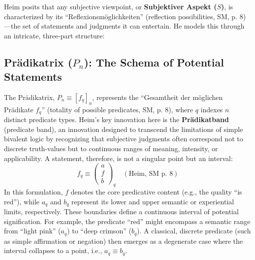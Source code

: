 \documentclass[
    12pt,              %
    a4paper,           %
    headings=normal,   %
    twoside=true,      %
    BCOR=8mm,          %
]{scrbook}
\newcommand{\q}[1]{\enquote{#1}}
\newcommand{\subjektiveraspekt}{S}
\begin{document}
Heim posits that any subjective viewpoint, or \textbf{Subjektiver Aspekt (\(\subjektiveraspekt\))}, is characterized by its \q{Reflexionsmöglichkeiten} (reflection possibilities, SM, p. 8)—the set of statements and judgments it can entertain. He models this through an intricate, three-part structure:

\subsection{\texorpdfstring{Prädikatrix (\(P_n\)): The Schema of Potential Statements}{Pradikatrix (Pn): The Schema of Potential Statements}}
\label{sec:ch1_pradikatrix}
The Prädikatrix, \(P_n \equiv [f_q]_n\), represents the \q{Gesamtheit der möglichen Prädikate \(f_q\)} (totality of possible predicates, SM, p. 8), where \(q\) indexes \(n\) distinct predicate types. Heim's key innovation here is the \textbf{Prädikatband} (predicate band), an innovation designed to transcend the limitations of simple bivalent logic by recognizing that subjective judgments often correspond not to discrete truth-values but to continuous ranges of meaning, intensity, or applicability. A statement, therefore, is not a singular point but an interval:
\[ f_q \equiv \begin{pmatrix} a \\ f \\ b \end{pmatrix}_q \quad (\text{Heim, SM p. 8}) \]
In this formulation, \(f\) denotes the core predicative content (e.g., the quality \q{is red}), while \(a_q\) and \(b_q\) represent its lower and upper semantic or experiential limits, respectively. These boundaries define a continuous interval of potential signification. For example, the predicate \q{red} might encompass a semantic range from \q{light pink} (\(a_q\)) to \q{deep crimson} (\(b_q\)). A classical, discrete predicate (such as simple affirmation or negation) then emerges as a degenerate case where the interval collapses to a point, i.e., \(a_q \equiv b_q\).
\end{document}
